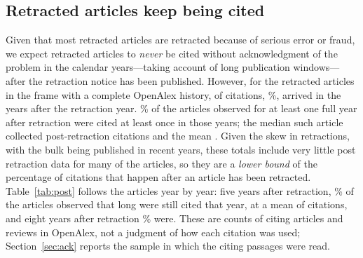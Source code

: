 \documentclass[11pt,letterpaper]{article}
\begin{document}
\subsection{Retracted articles keep being cited}
Given that most retracted articles are retracted because of serious error or fraud, we expect retracted articles to \textit{never} be cited without acknowledgment of the problem in the calendar years---taking account of long publication windows---after the retraction notice has been published. However, for the \PostArticles{} retracted articles in the frame with a complete OpenAlex history, \PostAfter{} of \PostCitations{} citations, \PostAfterShare\%, arrived in the years after the retraction year. \PostCitedShare\% of the articles observed for at least one full year after retraction were cited at least once in those years; the median such article collected \PostMedianAfter{} post-retraction citations and the mean \PostMeanAfter. Given the skew in retractions, with the bulk being published in recent years, these totals include very little post retraction data for many of the articles, so they are a \textit{lower bound} of the percentage of citations that happen after an article has been retracted. Table~\ref{tab:post} follows the articles year by year: five years after retraction, \PostCitedAtFive\% of the \PostArticlesAtFive{} articles observed that long were still cited that year, at a mean of \PostMeanAtFive{} citations, and eight years after retraction \PostCitedAtEight\% were. These are counts of citing articles and reviews in OpenAlex, not a judgment of how each citation was used; Section~\ref{sec:ack} reports the sample in which the citing passages were read.

\begin{table}[tb]
\centering
\caption{Citations to retracted articles by years after the retraction year, for the retracted articles in the frame with a complete OpenAlex history. Each row covers the articles whose retraction was at least that many years before the end of the citation data (2025). Cited at all is the share of those articles with at least one citation in that year.}
\label{tab:post}
\end{table}
\end{document}

